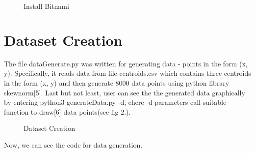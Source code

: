 \documentclass[11pt]{article}
\begin{document}
	\begin{figure}[H]
		\caption{Install Bitnami}
	\end{figure}

	
	\newpage
	\section{Dataset Creation}
	The file dataGenerate.py was written for generating data - points in the form (x, y). Specifically, it reads data from file centroids.csv which contains three centroids in the form (x, y) and then generate 8000 data points using python library skewnorm[5]. Last but not least, user can see the the generated data graphically by entering python3 generateData.py -d, ehere -d parameters call suitable function to draw[6] data points(see fig 2.).
	        
	
	\begin{figure}[H]
		\caption{Dataset Creation}
	\end{figure}
	
Now, we can see the code for data generation. 
\end{document}
